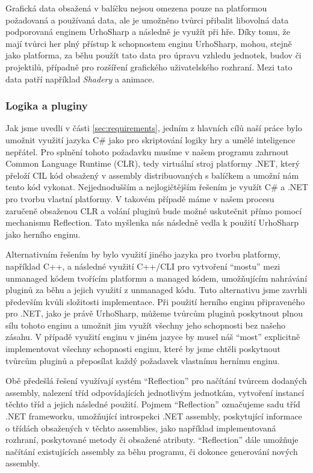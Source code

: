 Grafická data obsažená v balíčku nejsou omezena pouze na platformou požadovaná a používaná data, ale je umožněno tvůrci přibalit libovolná data podporovaná enginem UrhoSharp a následně je využít při hře. Díky tomu, že mají tvůrci her plný přístup k schopnostem enginu UrhoSharp, mohou, stejně jako platforma, za běhu použít tato data pro úpravu vzhledu jednotek, budov či projektilů, případně pro rozšíření grafického uživatelského rozhraní. Mezi tato data patří například \textit{Shadery} a animace.

\subsubsection{Logika a pluginy}
Jak jsme uvedli v části \ref{sec:requirements}, jedním z hlavních cílů naší práce bylo umožnit využití jazyka C\# jako pro skriptování logiky hry a umělé inteligence nepřátel. Pro splnění tohoto požadavku musíme v našem programu zahrnout Common Language Runtime (CLR), tedy virtuální stroj platformy .NET, který přeloží CIL kód obsažený v assembly distribuovaných s balíčkem a umožní nám tento kód vykonat. Nejjednodušším a nejlogičtějším řešením je využít C\# a .NET pro tvorbu vlastní platformy. V takovém případě máme v našem procesu zaručeně obsaženou CLR a volání pluginů bude možné uskutečnit přímo pomocí mechanismu Reflection. Tato myšlenka nás následně vedla k použití UrhoSharp jako herního enginu. 

Alternativním řešením by bylo využití jiného jazyka pro tvorbu platformy, například C++, a následné využití C++/CLI pro vytvoření ``mostu'' mezi unmanaged kódem tvořícím platformu a managed kódem, umožňujícím nahrávání pluginů za běhu a jejich využití z unmanaged kódu. Tuto alternativu jsme zavrhli především kvůli složitosti implementace. Při použití herního enginu připraveného pro .NET, jako je právě UrhoSharp, můžeme tvůrcům pluginů poskytnout plnou sílu tohoto enginu a umožnit jim využít všechny jeho schopnosti bez našeho zásahu. V případě využití enginu v jiném jazyce by musel náš ``most'' explicitně implementovat všechny schopnosti enginu, které by jsme chtěli poskytnout tvůrcům pluginů a přeposílat každý požadavek vlastnímu hernímu enginu.

Obě předešlá řešení využívají systém ``Reflection'' pro načítání tvůrcem dodaných assembly, nalezení tříd odpovídajících jednotlivým jednotkám, vytvoření instancí těchto tříd a jejich následné použití. Pojmem ``Reflection'' označujeme sadu tříd .NET frameworku, umožňující introspekci .NET assembly, poskytující informace o třídách obsažených v těchto assemblies, jako například implementovaná rozhraní, poskytované metody či obsažené atributy. ``Reflection'' dále umožňuje načítání existujících assembly za běhu programu, či dokonce generování nových assembly. 

